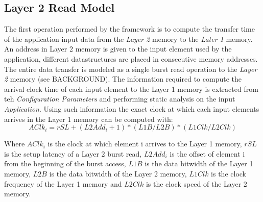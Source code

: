 \subsection{Layer 2 Read Model}
\label{ssec:l2_read_model}
The first operation performed by the framework is to compute the transfer time of the application input data from the \textit{Layer 2} memory to the \textit{Later 1} memory. An address in Layer 2 memory is given to the input element used by the application, different datastructures are placed in consecutive memory addresses. The entire data transfer is modeled as a single burst read operation to the \textit{Layer 2} memory (see BACKGROUND). The information required to compute the arrival clock time of each input element to the Layer 1 memory is extracted from teh \textit{Configuration Parameters} and performing static analysis on the input \textit{Application}.
Using such information  the exact clock at which each input elements arrives in the Layer 1 memory can be computed with:
$$
AClk_i = rSL + (L2Add_i+1) * (L1B/L2B) * (L1Clk/L2Clk)
$$

Where $AClk_i$ is the clock at which element i arrives to the Layer 1 memory, $rSL$ is the setup latency of a Layer 2 burst read, $L2Add_i$ is the offset of element i from the beginning of the burst access, $L1B$ is the data bitwidth of the Layer 1 memory, $L2B$ is the data bitwidth of the Layer 2 memory, $L1Clk$ is the clock frequency of the Layer 1 memory and $L2Clk$ is the clock speed of the Layer 2 memory.

